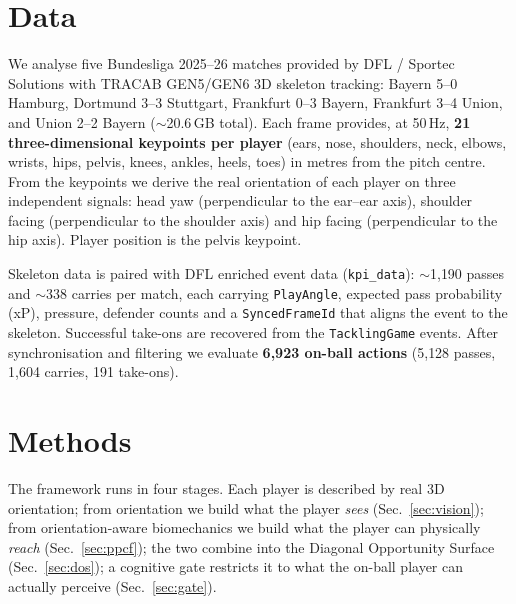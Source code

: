\documentclass[11pt]{article}
\begin{document}
\section{Data}
\label{sec:data}

We analyse five Bundesliga 2025--26 matches provided by DFL / Sportec
Solutions with TRACAB GEN5/GEN6 3D skeleton tracking: Bayern 5--0 Hamburg,
Dortmund 3--3 Stuttgart, Frankfurt 0--3 Bayern, Frankfurt 3--4 Union, and
Union 2--2 Bayern ($\sim$20.6\,GB total). Each frame provides, at 50\,Hz,
\textbf{21 three-dimensional keypoints per player} (ears, nose, shoulders,
neck, elbows, wrists, hips, pelvis, knees, ankles, heels, toes) in metres
from the pitch centre. From the keypoints we derive the real orientation of
each player on three independent signals: head yaw (perpendicular to the
ear--ear axis), shoulder facing (perpendicular to the shoulder axis) and hip
facing (perpendicular to the hip axis). Player position is the pelvis
keypoint.

Skeleton data is paired with DFL enriched event data (\texttt{kpi\_data}):
$\sim$1{,}190 passes and $\sim$338 carries per match, each carrying
\texttt{PlayAngle}, expected pass probability (xP), pressure, defender
counts and a \texttt{SyncedFrameId} that aligns the event to the skeleton.
Successful take-ons are recovered from the \texttt{TacklingGame} events.
After synchronisation and filtering we evaluate \textbf{6{,}923 on-ball
actions} (5{,}128 passes, 1{,}604 carries, 191 take-ons).


\section{Methods}
\label{sec:methods}

The framework runs in four stages. Each player is described by real 3D
orientation; from orientation we build what the player \emph{sees}
(Sec.~\ref{sec:vision}); from orientation-aware biomechanics we build what
the player can physically \emph{reach} (Sec.~\ref{sec:ppcf}); the two
combine into the Diagonal Opportunity Surface (Sec.~\ref{sec:dos}); a
cognitive gate restricts it to what the on-ball player can actually
perceive (Sec.~\ref{sec:gate}).
\end{document}
